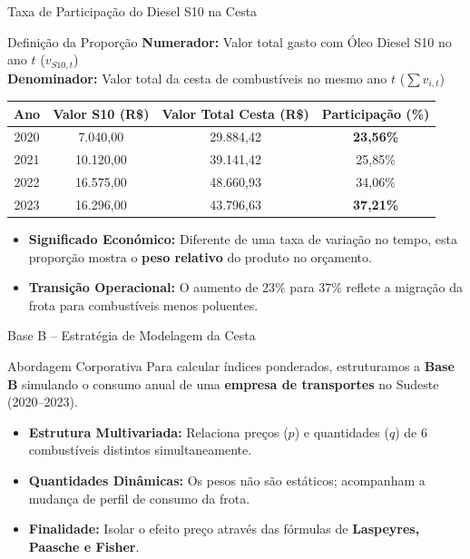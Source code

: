 \documentclass{beamer}
\begin{document}
\begin{frame}{Taxa de Participação do Diesel S10 na Cesta}
\begin{block}{Definição da Proporção}
    \scriptsize
    \textbf{Numerador:} Valor total gasto com Óleo Diesel S10 no ano $t$ ($v_{S10,t}$) \\
    \textbf{Denominador:} Valor total da cesta de combustíveis no mesmo ano $t$ ($\sum v_{i,t}$)
\end{block}

\begin{table}
\centering
\small
\begin{tabular}{cccc}
\toprule
\textbf{Ano} & \textbf{Valor S10 (R\$)} & \textbf{Valor Total Cesta (R\$)} & \textbf{Participação (\%)} \\
\midrule
2020 & 7.040,00 & 29.884,42 & \textbf{23,56\%} \\
2021 & 10.120,00 & 39.141,42 & 25,85\% \\
2022 & 16.575,00 & 48.660,93 & 34,06\% \\
2023 & 16.296,00 & 43.796,63 & \textbf{37,21\%} \\
\bottomrule
\end{tabular}
\end{table}

\begin{itemize}
    \item \textbf{Significado Económico:} Diferente de uma taxa de variação no tempo, esta proporção mostra o \textbf{peso relativo} do produto no orçamento.
    \item \textbf{Transição Operacional:} O aumento de 23\% para 37\% reflete a migração da frota para combustíveis menos poluentes.
\end{itemize}
\end{frame}


\begin{frame}{Base B -- Estratégia de Modelagem da Cesta}
\begin{block}{Abordagem Corporativa}
    Para calcular índices ponderados, estruturamos a \textbf{Base B} simulando o consumo anual de uma \textbf{empresa de transportes} no Sudeste (2020--2023).
\end{block}
\vspace{0.2cm}
\begin{itemize}
    \item \textbf{Estrutura Multivariada:} Relaciona preços ($p$) e quantidades ($q$) de 6 combustíveis distintos simultaneamente.
    \item \textbf{Quantidades Dinâmicas:} Os pesos não são estáticos; acompanham a mudança de perfil de consumo da frota.
    \item \textbf{Finalidade:} Isolar o efeito preço através das fórmulas de \textbf{Laspeyres, Paasche e Fisher}.
\end{itemize}
\end{frame}
\end{document}
